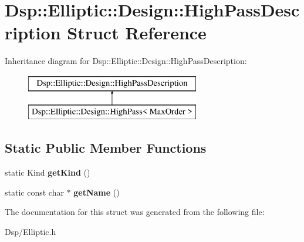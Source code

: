 \hypertarget{structDsp_1_1Elliptic_1_1Design_1_1HighPassDescription}{\section{Dsp\-:\-:Elliptic\-:\-:Design\-:\-:High\-Pass\-Description Struct Reference}
\label{structDsp_1_1Elliptic_1_1Design_1_1HighPassDescription}
}
Inheritance diagram for Dsp\-:\-:Elliptic\-:\-:Design\-:\-:High\-Pass\-Description\-:\begin{figure}[H]
\begin{center}
\leavevmode
\includegraphics[height=2.000000cm]{structDsp_1_1Elliptic_1_1Design_1_1HighPassDescription}
\end{center}
\end{figure}
\subsection*{Static Public Member Functions}
\begin{DoxyCompactItemize}
\item 
\hypertarget{structDsp_1_1Elliptic_1_1Design_1_1HighPassDescription_a4608da1b89e0cd6d6abd612bb0fedf75}{static Kind {\bfseries get\-Kind} ()}\label{structDsp_1_1Elliptic_1_1Design_1_1HighPassDescription_a4608da1b89e0cd6d6abd612bb0fedf75}

\item 
\hypertarget{structDsp_1_1Elliptic_1_1Design_1_1HighPassDescription_a825e74d631b6ce9508005e595b5e393b}{static const char $\ast$ {\bfseries get\-Name} ()}\label{structDsp_1_1Elliptic_1_1Design_1_1HighPassDescription_a825e74d631b6ce9508005e595b5e393b}

\end{DoxyCompactItemize}


The documentation for this struct was generated from the following file\-:\begin{DoxyCompactItemize}
\item 
Dsp/Elliptic.\-h\end{DoxyCompactItemize}
